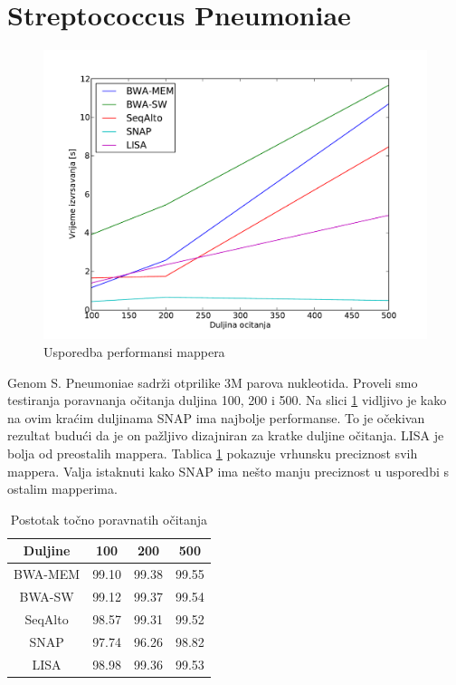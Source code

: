 \documentclass[times, utf8, diplomski]{fer}
\begin{document}
\section {Streptococcus Pneumoniae}

\begin{figure}[H]
\centering
\includegraphics[width=1.0\textwidth]{../img/streptococcus-time.pdf}
\caption{Usporedba performansi mappera}\label{streptococcus-time}
\end{figure}

Genom S. Pneumoniae sadrži otprilike 3M parova nukleotida. Proveli smo testiranja poravnanja očitanja duljina 100, 200 i 500. Na slici \ref{streptococcus-time} vidljivo je kako na ovim kraćim duljinama SNAP ima najbolje performanse. To je očekivan rezultat budući da je on pažljivo dizajniran za kratke duljine očitanja. LISA je bolja od preostalih mappera. Tablica \ref{streptococcus-correct} pokazuje vrhunsku preciznost svih mappera. Valja istaknuti kako SNAP ima nešto manju preciznost u usporedbi s ostalim mapperima.

\begin{table}[H]
\centering
\begin{tabular}{|c||c|c|c|}
\hline
	Duljine & 100 & 200 & 500\\
\hline
\hline
	BWA-MEM & 99.10 & 99.38 & 99.55\\
\hline
	BWA-SW  & 99.12 & 99.37 & 99.54\\
\hline
	SeqAlto & 98.57 & 99.31 & 99.52\\
\hline
	SNAP    & 97.74 & 96.26 & 98.82\\
\hline
	LISA    & 98.98 & 99.36 & 99.53\\
\hline
\end{tabular}
\caption{Postotak točno poravnatih očitanja}\label{streptococcus-correct}
\end{table}
\end{document}
